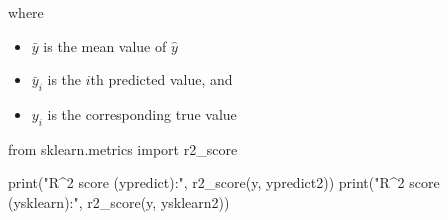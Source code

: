 \documentclass[%
oneside,                 %
final,                   %
10pt]{article}
\begin{document}
where 

\begin{itemize}
\item $\bar{y}$ is the mean value of $\hat{y}$

\item $\bar{y}_i$ is the $i$th predicted value, and

\item $y_i$ is the corresponding true value
\end{itemize}

\noindent
\bpycod
from sklearn.metrics import r2_score

print("R^2 score (ypredict):", r2_score(y, ypredict2))
print("R^2 score (ysklearn):", r2_score(y, ysklearn2))
\epycod



\end{document}
